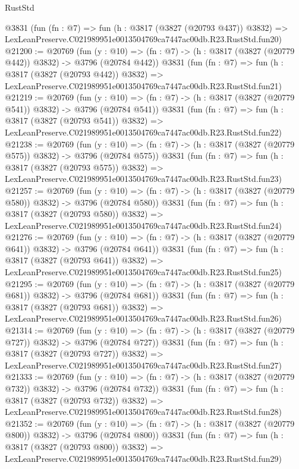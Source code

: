 \begin{lexlean}{RustStd}
\begin{coremodule}
    @3831
    (fun (fn : @7) =>
    fun (h : @3817 (@3827 (@20793 @437)) @3832) =>
    LexLeanPreserve.C021989951e0013504769ca7447ac00db.R23.RustStd.fun20)
@21200 := @20769
    (fun (y : @10) => (fn : @7) -> (h : @3817 (@3827 (@20779 @442)) @3832) -> @3796 (@20784 @442))
    @3831
    (fun (fn : @7) =>
    fun (h : @3817 (@3827 (@20793 @442)) @3832) =>
    LexLeanPreserve.C021989951e0013504769ca7447ac00db.R23.RustStd.fun21)
@21219 := @20769
    (fun (y : @10) => (fn : @7) -> (h : @3817 (@3827 (@20779 @541)) @3832) -> @3796 (@20784 @541))
    @3831
    (fun (fn : @7) =>
    fun (h : @3817 (@3827 (@20793 @541)) @3832) =>
    LexLeanPreserve.C021989951e0013504769ca7447ac00db.R23.RustStd.fun22)
@21238 := @20769
    (fun (y : @10) => (fn : @7) -> (h : @3817 (@3827 (@20779 @575)) @3832) -> @3796 (@20784 @575))
    @3831
    (fun (fn : @7) =>
    fun (h : @3817 (@3827 (@20793 @575)) @3832) =>
    LexLeanPreserve.C021989951e0013504769ca7447ac00db.R23.RustStd.fun23)
@21257 := @20769
    (fun (y : @10) => (fn : @7) -> (h : @3817 (@3827 (@20779 @580)) @3832) -> @3796 (@20784 @580))
    @3831
    (fun (fn : @7) =>
    fun (h : @3817 (@3827 (@20793 @580)) @3832) =>
    LexLeanPreserve.C021989951e0013504769ca7447ac00db.R23.RustStd.fun24)
@21276 := @20769
    (fun (y : @10) => (fn : @7) -> (h : @3817 (@3827 (@20779 @641)) @3832) -> @3796 (@20784 @641))
    @3831
    (fun (fn : @7) =>
    fun (h : @3817 (@3827 (@20793 @641)) @3832) =>
    LexLeanPreserve.C021989951e0013504769ca7447ac00db.R23.RustStd.fun25)
@21295 := @20769
    (fun (y : @10) => (fn : @7) -> (h : @3817 (@3827 (@20779 @681)) @3832) -> @3796 (@20784 @681))
    @3831
    (fun (fn : @7) =>
    fun (h : @3817 (@3827 (@20793 @681)) @3832) =>
    LexLeanPreserve.C021989951e0013504769ca7447ac00db.R23.RustStd.fun26)
@21314 := @20769
    (fun (y : @10) => (fn : @7) -> (h : @3817 (@3827 (@20779 @727)) @3832) -> @3796 (@20784 @727))
    @3831
    (fun (fn : @7) =>
    fun (h : @3817 (@3827 (@20793 @727)) @3832) =>
    LexLeanPreserve.C021989951e0013504769ca7447ac00db.R23.RustStd.fun27)
@21333 := @20769
    (fun (y : @10) => (fn : @7) -> (h : @3817 (@3827 (@20779 @732)) @3832) -> @3796 (@20784 @732))
    @3831
    (fun (fn : @7) =>
    fun (h : @3817 (@3827 (@20793 @732)) @3832) =>
    LexLeanPreserve.C021989951e0013504769ca7447ac00db.R23.RustStd.fun28)
@21352 := @20769
    (fun (y : @10) => (fn : @7) -> (h : @3817 (@3827 (@20779 @800)) @3832) -> @3796 (@20784 @800))
    @3831
    (fun (fn : @7) =>
    fun (h : @3817 (@3827 (@20793 @800)) @3832) =>
    LexLeanPreserve.C021989951e0013504769ca7447ac00db.R23.RustStd.fun29)

\end{coremodule}
\end{lexlean}
